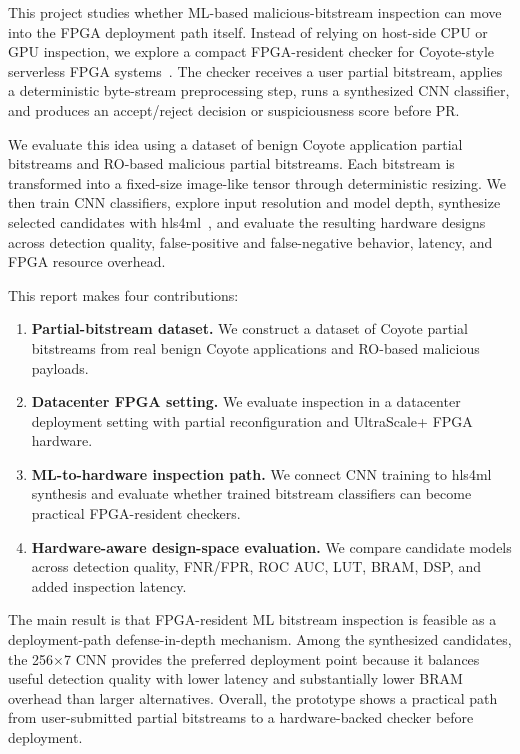 This project studies whether ML-based malicious-bitstream inspection can move into the FPGA deployment path itself. Instead of relying on host-side CPU or GPU inspection, we explore a compact FPGA-resident checker for Coyote-style serverless FPGA systems~\cite{korolija2020os,ramhorst2025coyote}. The checker receives a user partial bitstream, applies a deterministic byte-stream preprocessing step, runs a synthesized CNN classifier, and produces an accept/reject decision or suspiciousness score before PR.

We evaluate this idea using a dataset of benign Coyote application partial bitstreams and RO-based malicious partial bitstreams. Each bitstream is transformed into a fixed-size image-like tensor through deterministic resizing. We then train CNN classifiers, explore input resolution and model depth, synthesize selected candidates with hls4ml~\cite{duarte2018fast,aarrestad2021fast}, and evaluate the resulting hardware designs across detection quality, false-positive and false-negative behavior, latency, and FPGA resource overhead.

This report makes four contributions:

\begin{enumerate}
    \item \textbf{Partial-bitstream dataset.}
    We construct a dataset of Coyote partial bitstreams from real benign Coyote applications and RO-based malicious payloads.

    \item \textbf{Datacenter FPGA setting.}
    We evaluate inspection in a datacenter deployment setting with partial reconfiguration and UltraScale+ FPGA hardware.

    \item \textbf{ML-to-hardware inspection path.}
    We connect CNN training to hls4ml synthesis and evaluate whether trained bitstream classifiers can become practical FPGA-resident checkers.

    \item \textbf{Hardware-aware design-space evaluation.}
    We compare candidate models across detection quality, FNR/FPR, ROC AUC, LUT, BRAM, DSP, and added inspection latency.
\end{enumerate}

The main result is that FPGA-resident ML bitstream inspection is feasible as a deployment-path defense-in-depth mechanism. Among the synthesized candidates, the 256$\times$7 CNN provides the preferred deployment point because it balances useful detection quality with lower latency and substantially lower BRAM overhead than larger alternatives. Overall, the prototype shows a practical path from user-submitted partial bitstreams to a hardware-backed checker before deployment.
